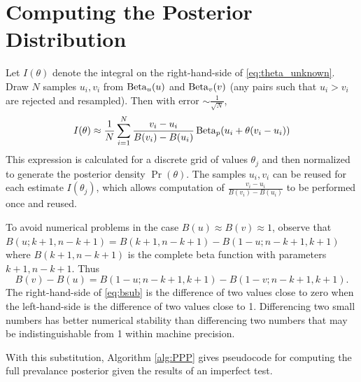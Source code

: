 \documentclass[dvipdfmx]{article}
\begin{document}
\section{Computing the Posterior Distribution}
Let $I(\theta)$ denote the integral on the right-hand-side of
\eqref{eq:theta_unknown}.  Draw $N$ samples $u_i,v_i$ from
$\operatorname{Beta}_u(u)$ and $\operatorname{Beta}_v(v)$ (any pairs such that $u_i>v_i$ are
rejected and resampled). Then with error $\sim \frac{1}{\sqrt{N}}$,
\begin{equation}
  \label{eq:approx}
  I(\theta) \approx \frac1N\sum_{i=1}^N \frac{v_i-u_i}{B(v_i)-B(u_i)}
  \operatorname{Beta}_p(u_i + \theta(v_i-u_i))
\end{equation}
This expression is calculated for a discrete grid of values $\theta_j$
and then normalized to generate the posterior density $\Pr(\theta)$.
The samples $u_i,v_i$ can be reused for each estimate $I(\theta_j)$,
which allows computation of $\frac{v_i-u_i}{B(v_i)-B(u_i)}$ to be
performed once and reused.

To avoid numerical problems in the case $B(u) \approx B(v) \approx 1$,
observe that $B(u;k+1,n-k+1) = B(k+1,n-k+1)-B(1-u;n-k+1,k+1)$ where
$B(k+1,n-k+1)$ is the complete beta function with parameters $k+1,
n-k+1$. Thus
\begin{equation}
  \label{eq:bsub}
  B(v) - B(u) = B(1-u; n-k+1,k+1) - B(1-v; n-k+1,k+1).
\end{equation}
The right-hand-side of \eqref{eq:bsub} is the difference of two values
close to zero when the left-hand-side is the difference of two values
close to 1. Differencing two small numbers has better numerical
stability than differencing two numbers that may be indistinguishable
from 1 within machine precision.

With this substitution, Algorithm \ref{alg:PPP} gives pseudocode for
computing the full prevalance posterior given the results of an
imperfect test.
\end{document}
